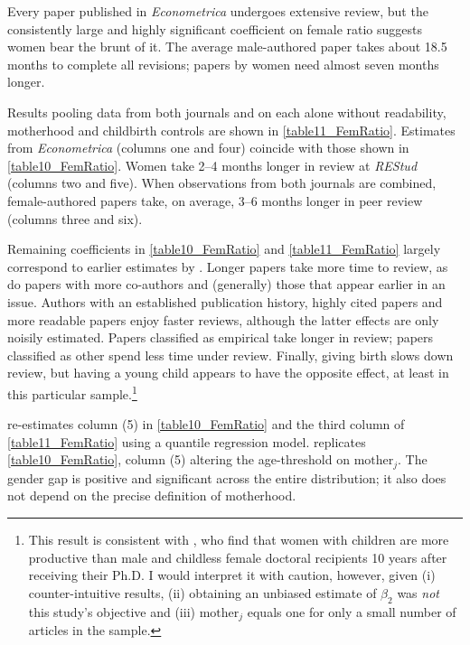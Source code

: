 Every paper published in \emph{Econometrica} undergoes extensive review, but the consistently large and highly significant coefficient on female ratio suggests women bear the brunt of it. The average male-authored paper takes about 18.5 months to complete all revisions; papers by women need almost seven months longer.

Results pooling data from both journals and on each alone without readability, motherhood and childbirth controls are shown in \autoref{table11_FemRatio}. Estimates from \emph{Econometrica} (columns one and four) coincide with those shown in \autoref{table10_FemRatio}. Women take 2--4 months longer in review at \emph{REStud} (columns two and five). When observations from both journals are combined, female-authored papers take, on average, 3--6 months longer in peer review (columns three and six).



Remaining coefficients in \autoref{table10_FemRatio} and \autoref{table11_FemRatio} largely correspond to earlier estimates by  \citet{Ellison2002a}. Longer papers take more time to review, as do papers with more co-authors and (generally) those that appear earlier in an issue. Authors with an established publication history, highly cited papers and more readable papers enjoy faster reviews, although the latter effects are only noisily estimated. Papers classified as empirical take longer in review; papers classified as other spend less time under review. Finally, giving birth slows down review, but having a young child appears to have the opposite effect, at least in this particular sample.\footnote{This result is consistent with  \citet{Ginther2004}, who find that women with children are more productive than male and childless female doctoral recipients 10 years after receiving their Ph.D. I would interpret it with caution, however, given (i) counter-intuitive results, (ii) obtaining an unbiased estimate of $\beta_2$ was \emph{not} this study's objective and (iii) $\text{mother}_j$ equals one for only a small number of articles in the sample.}

 re-estimates column (5) in \autoref{table10_FemRatio} and the third column of \autoref{table11_FemRatio} using a quantile regression model.  replicates \autoref{table10_FemRatio}, column (5) altering the age-threshold on $\text{mother}_j$. The gender gap is positive and significant across the entire distribution; it also does not depend on the precise definition of motherhood.

